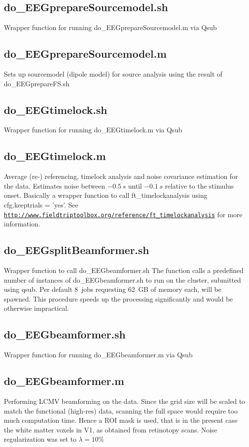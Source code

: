 \documentclass[12pt,a4paper]{scrartcl}
\begin{document}
\subsection{do\_EEGprepareSourcemodel.sh}
\label{sec:prepSM}
Wrapper function for running do\_EEGprepareSourcemodel.m via Qsub

\subsection{do\_EEGprepareSourcemodel.m}
Sets up sourcemodel (dipole model) for source analysis using the result of do\_EEGprepareFS.sh

\subsection{do\_EEGtimelock.sh}
\label{sec:timelock}
Wrapper function for running do\_EEGtimelock.m via Qsub

\subsection{do\_EEGtimelock.m}
Average (re-) referencing, timelock analysis and noise covariance estimation for the data. Estimates noise between $-0.5~s$ until $-0.1~s$ relative to the stimulus onset. Basically a wrapper function to call ft\_timelockanalysis using cfg.keeptrials = 'yes'. See \href{http://www.fieldtriptoolbox.org/reference/ft\_timelockanalysis}{\nolinkurl{http://www.fieldtriptoolbox.org/reference/ft\_timelockanalysis}} for more information.

\subsection{do\_EEGsplitBeamformer.sh}
\label{sec:beamf}
Wrapper function to call do\_EEGbeamformer.sh The function calls a predefined number of instances of do\_EEGbeamformer.sh to run on the cluster, submitted using qsub. Per default 8~jobs requesting 62~GB of memory each, will be spawned. This procedure speeds up the processing significantly and would be otherwise impractical.\\

\subsection{do\_EEGbeamformer.sh}
Wrapper function for running do\_EEGbeamformer.m via Qsub

\subsection{do\_EEGbeamformer.m}
Performing LCMV beamforming on the data. Since the grid size will be scaled to match the functional (high-res) data, scanning the full space would require too much computation time. Hence a ROI mask is used, that is in the present case the white matter voxels in V1, as obtained from retinotopy scans. Noise regularization was set to $\lambda=10\%$
\end{document}
